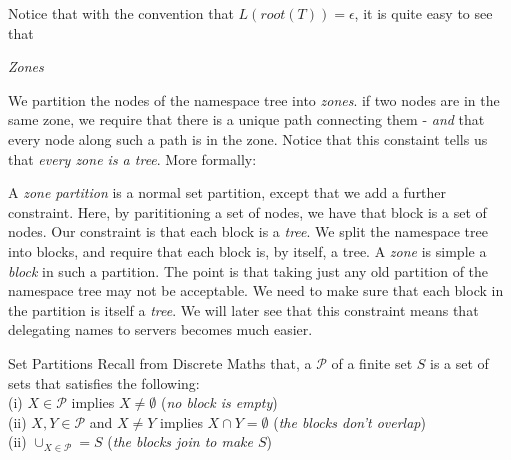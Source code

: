 \frmrule 


\frmrule 

Notice that with the convention that $L(root(T)) = \epsilon$, 
it is quite easy to see that 





\begin{example}
\end{example}

\frmrule 


\textit{Zones}

We partition the nodes of the namespace tree into \textit{zones}. 
if two nodes are in the same zone, we require that there is a unique 
path connecting them - \textit{and} that every node along 
such a path is in the zone. Notice that this constaint tells 
us that \textit{every zone is a tree}. More formally:




A \textit{zone partition} is a normal set partition, except that we add a further 
constraint. Here, by parititioning a set of nodes, 
we have that block is a set of nodes. Our constraint is that 
each block is a \textit{tree}. We split the namespace tree into blocks, and require 
that each block is, by itself, a tree.
A \textit{zone} is simple a \textit{block} in such a partition. 
The point is that taking just any old partition of the namespace tree may not be acceptable. 
We need to make sure that each block in the partition is itself a \textit{tree}. 
We will later see that this constraint means that delegating names 
to servers becomes much easier.

\begin{sidenote}{Set Partitions} 
Recall from Discrete Maths that, a  $\mathcal{P}$ of a finite set $S$ is a set of sets 
that satisfies the following:\\
(i) $X \in \mathcal{P}$ implies $X \neq \emptyset$ (\textit{no block is empty})\\
(ii) $X,Y \in \mathcal{P}$ and $X \neq Y$ implies $X \cap Y = \emptyset$ (\textit{the blocks don't overlap})\\
(ii) $\cup_{X \in \mathcal{P}} = S$ (\textit{the blocks join to make $S$})
\end{sidenote}

